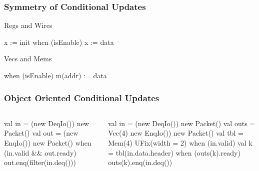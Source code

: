\documentclass[xcolor=pdflatex,dvipsnames,table]{beamer}
\begin{document}
\begin{frame}[fragile]
\frametitle{Symmetry of Conditional Updates}

Regs and Wires
\begin{scala}
x := init
when (isEnable) {
  x := data
}
\end{scala}
 
Vecs and Mems
\begin{scala}
when (isEnable) {
  m(addr) := data
}
\end{scala}

\end{frame}

\begin{frame}[fragile]
\frametitle{Object Oriented Conditional Updates}

% 
% 
% 

\begin{columns}

{
\begin{scala}
val in  = (new DeqIo()){ new Packet() }
val out = (new EnqIo()){ new Packet() }
when (in.valid && out.ready) {
  out.enq(filter(in.deq()))
}
\end{scala}

\vskip5mm

\begin{scala}
val in   = (new DeqIo()){ new Packet() }
val outs = Vec(4){ new EnqIo()){ new Packet() } }
val tbl  = Mem(4){ UFix(width = 2) }
when (in.valid) {
  val k = tbl(in.data.header)
  when (outs(k).ready) {
    outs(k).enq(in.deq())
  }
}
\end{scala}
}



\end{columns}
\end{frame}
\end{document}
